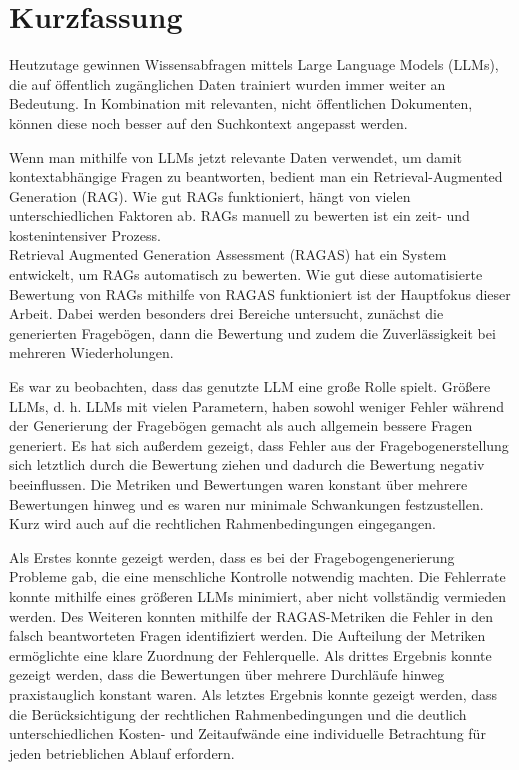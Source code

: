 \chapter*{Kurzfassung}
\label{chap:abstract}

Heutzutage gewinnen Wissensabfragen mittels Large Language Models (LLMs), die auf öffentlich zugänglichen Daten trainiert wurden immer weiter an Bedeutung.
In Kombination mit relevanten, nicht öffentlichen Dokumenten, können diese noch besser auf den Suchkontext angepasst werden.

Wenn man mithilfe von LLMs jetzt relevante Daten verwendet, um damit kontextabhängige Fragen zu beantworten, bedient man ein Retrieval-Augmented Generation (RAG).
Wie gut RAGs funktioniert, hängt von vielen unterschiedlichen Faktoren ab.
RAGs manuell zu bewerten ist ein zeit- und kostenintensiver Prozess.\\
Retrieval Augmented Generation Assessment (RAGAS) hat ein System entwickelt, um RAGs automatisch zu bewerten.
Wie gut diese automatisierte Bewertung von RAGs mithilfe von RAGAS funktioniert ist der Hauptfokus dieser Arbeit.
Dabei werden besonders drei Bereiche untersucht, zunächst die generierten Fragebögen, dann die Bewertung und zudem die Zuverlässigkeit bei mehreren Wiederholungen.

Es war zu beobachten, dass das genutzte LLM eine große Rolle spielt.
Größere LLMs, d. h. LLMs mit vielen Parametern, haben sowohl weniger Fehler während der Generierung der Fragebögen gemacht als auch allgemein bessere Fragen generiert.
Es hat sich außerdem gezeigt, dass Fehler aus der Fragebogenerstellung sich letztlich durch die Bewertung ziehen und dadurch die Bewertung negativ beeinflussen.
Die Metriken und Bewertungen waren konstant über mehrere Bewertungen hinweg und es waren nur minimale Schwankungen festzustellen.
Kurz wird auch auf die rechtlichen Rahmenbedingungen eingegangen.

Als Erstes konnte gezeigt werden, dass es bei der Fragebogengenerierung Probleme gab, die eine menschliche Kontrolle notwendig machten. Die Fehlerrate konnte mithilfe eines größeren LLMs minimiert, aber nicht vollständig vermieden werden.
Des Weiteren konnten mithilfe der RAGAS-Metriken die Fehler in den falsch beantworteten Fragen identifiziert werden. Die Aufteilung der Metriken ermöglichte eine klare Zuordnung der Fehlerquelle.
Als drittes Ergebnis konnte gezeigt werden, dass die Bewertungen über mehrere Durchläufe hinweg praxistauglich konstant waren.
Als letztes Ergebnis konnte gezeigt werden, dass die Berücksichtigung der rechtlichen Rahmenbedingungen und die deutlich unterschiedlichen Kosten- und Zeitaufwände eine individuelle Betrachtung für jeden betrieblichen Ablauf erfordern.

